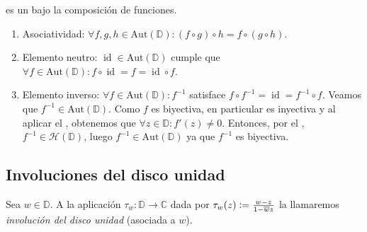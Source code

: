 \begin{lem}\label{lem:aut-disco-unidad-grupo}
     es un  bajo la composición de funciones.
\end{lem}
\begin{dem}
    \begin{enumerate}[label=(\roman*), wide, labelindent=0pt]
        \item Asociatividad: $\forall f, g, h \in \mathrm{Aut} \left(\mathbb{D} \right) : (f \circ g) \circ h = f \circ (g \circ h)$.
        \item Elemento neutro: $\operatorname{id} \in \mathrm{Aut} \left(\mathbb{D} \right)$ cumple que $\forall f \in \mathrm{Aut} \left(\mathbb{D} \right) : f \circ \operatorname{id} = f = \operatorname{id} \circ f$.
        \item Elemento inverso: $\forall f \in \mathrm{Aut} \left(\mathbb{D} \right) : f^{-1}$ satisface $f \circ f^{-1} = \operatorname{id} = f^{-1} \circ f$. Veamos que $f^{-1} \in \mathrm{Aut} \left(\mathbb{D} \right)$. Como $f$ es biyectiva, en particular es inyectiva y al aplicar el , obtenemos que $\forall z \in \mathbb{D} : f'(z) \neq 0$. Entonces, por el , $f^{-1} \in \mathcal{H}(\mathbb{D})$, luego $f^{-1} \in \mathrm{Aut} \left(\mathbb{D} \right)$ ya que $f^{-1}$ es biyectiva.\hfill\qedsymbol
    \end{enumerate}
\end{dem}

\subsection{Involuciones del disco unidad}

\begin{defn}\label{defn:involucion-disco-unidad}
    Sea $w \in \mathbb{D}$. A la aplicación $\tau_w \colon \mathbb{D} \to \mathbb{C}$ dada por $\tau_w (z) \vcentcolon= \frac{w - z}{1 - \overline{w} z}$ la llamaremos \emph{involución del disco unidad} (asociada a $w$).
\end{defn}

